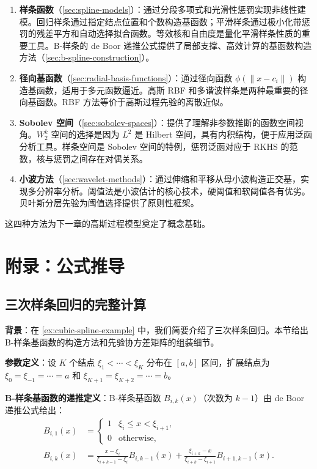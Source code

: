 \begin{enumerate}
\item \textbf{样条函数}（\cref{sec:spline-models}）：通过分段多项式和光滑性惩罚实现非线性建模。回归样条通过指定结点位置和个数构造基函数；平滑样条通过极小化带惩罚的残差平方和自动选择拟合函数。等效核和自由度是量化平滑样条性质的重要工具。B-样条的 de Boor 递推公式提供了局部支撑、高效计算的基函数构造方法（\cref{sec:b-spline-construction}）。
\item \textbf{径向基函数}（\cref{sec:radial-basis-functions}）：通过径向函数 $\phi(\|x - c_i\|)$ 构造基函数，适用于多元函数逼近。高斯 RBF 和多谐波样条是两种最重要的径向基函数。RBF 方法等价于高斯过程先验的离散近似。
\item \textbf{Sobolev 空间}（\cref{sec:sobolev-spaces}）：提供了理解非参数推断的函数空间视角。$W_2^k$ 空间的选择是因为 $L^2$ 是 Hilbert 空间，具有内积结构，便于应用泛函分析工具。样条空间是 Sobolev 空间的特例，惩罚泛函对应于 RKHS 的范数，核与惩罚之间存在对偶关系。
\item \textbf{小波方法}（\cref{sec:wavelet-methods}）：通过伸缩和平移从母小波构造正交基，实现多分辨率分析。阈值法是小波估计的核心技术，硬阈值和软阈值各有优劣。贝叶斯分层先验为阈值选择提供了原则性框架。
\end{enumerate}

这四种方法为下一章的高斯过程模型奠定了概念基础。

\section{附录：公式推导}\label{sec:appendix-chapter20}

\subsection{三次样条回归的完整计算}\label{sec:derivation-cubic-spline}

\textbf{背景}：在 \cref{ex:cubic-spline-example} 中，我们简要介绍了三次样条回归。本节给出 B-样条基函数的构造方法和先验协方差矩阵的组装细节。

\textbf{参数定义}：设 $K$ 个结点 $\xi_1 < \cdots < \xi_K$ 分布在 $[a, b]$ 区间，扩展结点为 $\xi_0 = \xi_{-1} = \cdots = a$ 和 $\xi_{K+1} = \xi_{K+2} = \cdots = b$。

\textbf{B-样条基函数的递推定义}：B-样条基函数 $B_{i,k}(x)$（次数为 $k-1$）由 de Boor 递推公式给出：
\begin{align}
B_{i,1}(x) &= \begin{cases} 1 & \xi_i \leq x < \xi_{i+1}, \\ 0 & \text{otherwise}, \end{cases} \label{eq:de-boor-base} \\
B_{i,k}(x) &= \frac{x - \xi_i}{\xi_{i+k-1} - \xi_i} B_{i,k-1}(x) + \frac{\xi_{i+k} - x}{\xi_{i+k} - \xi_{i+1}} B_{i+1,k-1}(x). \label{eq:de-boor-recursion}
\end{align}

